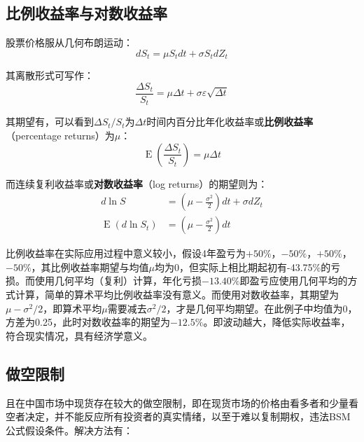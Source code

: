 \documentclass[11pt]{article}
\newcommand{\E}{\operatorname{E}}
\begin{document}
\subsection{比例收益率与对数收益率}

股票价格服从几何布朗运动：
\begin{equation*}
    dS_t = \mu S_t dt + \sigma S_t dZ_t
\end{equation*}

其离散形式可写作：
\begin{equation*}
    \frac{\Delta S_t}{S_t} = \mu \Delta t + \sigma \varepsilon \sqrt{\Delta t}
\end{equation*}

其期望有，可以看到$\Delta S_t/S_t$为$\Delta t$时间内百分比年化收益率或\textbf{比例收益率}（percentage returns）为$\mu$：
\begin{equation*}
    \E(\frac{\Delta S_t}{S_t}) = \mu \Delta t
\end{equation*}

而连续复利收益率或\textbf{对数收益率}（log returns）的期望则为：
\begin{align*}
    d\ln S       & = (\mu-\frac{\sigma^2}{2})dt+\sigma dZ_t \\
    \E(d\ln S_t) & = (\mu - \frac{\sigma^2}{2})dt
\end{align*}

比例收益率在实际应用过程中意义较小，假设4年盈亏为$+50\%$，$-50\%$，$+50\%$，$-50\%$，其比例收益率期望与均值$\mu$均为0，但实际上相比期起初有-43.75\%的亏损。而使用几何平均（复利）计算，年化亏损$-13.40\%$即盈亏应使用几何平均的方式计算，简单的算术平均比例收益率没有意义。而使用对数收益率，其期望为$\mu-\sigma^2/2$，即算术平均$\mu$需要减去$\sigma^2/2$，才是几何平均期望。在此例子中均值为0，方差为0.25，此时对数收益率的期望为$-12.5\%$。即波动越大，降低实际收益率，符合现实情况，具有经济学意义。

\subsection{做空限制}
且在中国市场中现货存在较大的做空限制，即在现货市场的价格由看多者和少量看空者决定，并不能反应所有投资者的真实情绪，以至于难以复制期权，违法BSM公式假设条件。解决方法有：
\end{document}

